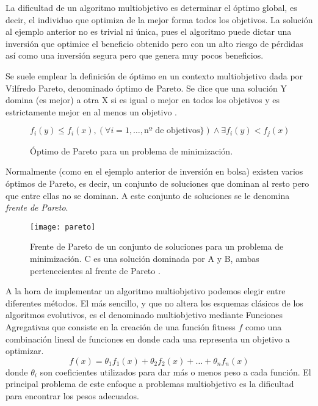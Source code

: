 La dificultad de un algoritmo multiobjetivo es determinar el óptimo global, es decir, el individuo que optimiza de la mejor forma todos los objetivos. La solución al ejemplo anterior no es trivial ni única, pues el algoritmo puede dictar una inversión que optimice el beneficio obtenido pero con un alto riesgo de pérdidas así como una inversión segura pero que genera muy pocos beneficios.

\blankline

Se suele emplear la definición de óptimo en un contexto multiobjetivo dada por Vilfredo Pareto, denominado óptimo de Pareto. Se dice que una solución Y domina (es mejor) a otra X si es igual o mejor en todos los objetivos y es estrictamente mejor en al menos un objetivo \cite{cervigon09}.
\begin{figure}[H]
\begin{equation*}
f_i(y) \leq f_i(x), (\forall i = 1, \dots, \textrm{nº de objetivos}\}) \wedge \exists f_i(y) < f_j(x)
\end{equation*}
\caption{Óptimo de Pareto para un problema de minimización.}
\end{figure}

Normalmente (como en el ejemplo anterior de inversión en bolsa) existen varios óptimos de Pareto, es decir, un conjunto de soluciones que dominan al resto pero que entre ellas no se dominan. A este conjunto de soluciones se le denomina \textit{frente de Pareto}.

\begin{figure}[H]
\centering
\texttt{[image: pareto]}
\caption{Frente de Pareto de un conjunto de soluciones para un problema de minimización. C es una solución dominada por A y B, ambas pertenecientes al frente de Pareto \cite{pictPareto}.}
\end{figure}

A la hora de implementar un algoritmo multiobjetivo podemos elegir entre diferentes  métodos. El más sencillo, y que no altera los esquemas clásicos de los algoritmos evolutivos, es el denominado multiobjetivo mediante Funciones Agregativas que consiste en la creación de una función fitness $f$ como una combinación lineal de funciones en donde cada una representa un objetivo a optimizar.
\begin{equation*}
f(x) = \theta_1f_1(x) + \theta_2f_2(x) + \dots + \theta_nf_n(x)
\end{equation*}
donde $\theta_i$ son coeficientes utilizados para dar más o menos peso a cada función. El principal problema de este enfoque a problemas multiobjetivo es la dificultad para encontrar los pesos adecuados.

